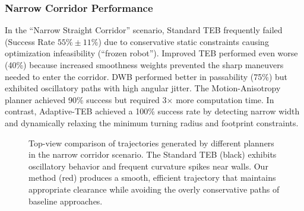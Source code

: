\documentclass[lettersize,journal]{IEEEtran}
\begin{document}
\subsubsection{Narrow Corridor Performance}
In the ``Narrow Straight Corridor'' scenario, Standard TEB frequently failed (Success Rate $55\% \pm 11\%$) due to conservative static constraints causing optimization infeasibility (``frozen robot''). Improved TEB performed even worse (40\%) because increased smoothness weights prevented the sharp maneuvers needed to enter the corridor. DWB performed better in passability (75\%) but exhibited oscillatory paths with high angular jitter. The Motion-Anisotropy planner achieved 90\% success but required 3$\times$ more computation time. In contrast, Adaptive-TEB achieved a 100\% success rate by detecting narrow width and dynamically relaxing the minimum turning radius and footprint constraints.

\begin{figure}[!t]
\centering
\caption{Top-view comparison of trajectories generated by different planners in the narrow corridor scenario. The Standard TEB (black) exhibits oscillatory behavior and frequent curvature spikes near walls. Our method (red) produces a smooth, efficient trajectory that maintains appropriate clearance while avoiding the overly conservative paths of baseline approaches.}
\label{fig:trajectory_comparison}
\end{figure}
\end{document}
